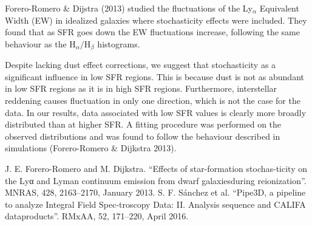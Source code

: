 \documentclass[preprint,proceedings]{rmaa}
\begin{document}
Forero-Romero \& Dijstra (2013) studied the fluctuations of the Ly$_{\alpha}$
Equivalent Width (EW) in idealized galaxies where stochasticity
effects were included. They found that as SFR goes down the EW
fluctuations increase, following the same behaviour as the
H$_{\alpha}/$H$_{\beta}$ histograms.

Despite lacking dust effect corrections, we suggest that 
stochasticity as a significant influence in low SFR regions. This is
because dust is not as abundant in low SFR regions as it is in high
SFR regions. Furthermore, interstellar reddening causes fluctuation in
only one direction, which is not the case for the data. In our
results, data associated with low SFR values is clearly more broadly
distributed than at higher SFR. A fitting procedure was performed on
the observed distributions and was found to follow the behaviour
described in simulations (Forero-Romero \& Dijkstra 2013).  \\
 
\begin{thebibliography}

 J. E. Forero-Romero and M. Dijkstra. “Effects of star-formation stochas-ticity on the Lyα and Lyman continuum emission from dwarf galaxiesduring  reionization”.  MNRAS, 428, 2163–2170, January 2013.
 S. F. S\'anchez et al. “Pipe3D, a pipeline to analyze Integral Field Spec-troscopy Data: II. Analysis sequence and CALIFA dataproducts”. RMxAA, 52, 171–220, April 2016.

  
\end{thebibliography}
\end{document}

